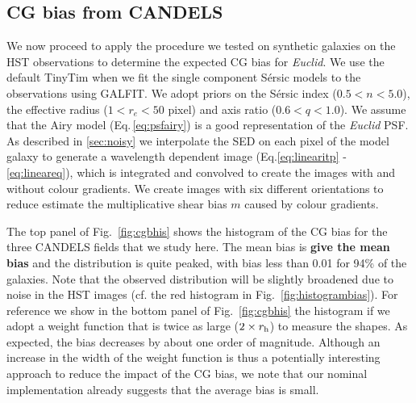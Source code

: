 \documentclass[useAMS,usenatbib]{mnras}
\begin{document}
\subsection{CG bias from CANDELS}

We now proceed to apply the procedure we tested on synthetic galaxies on the HST observations to determine the expected CG bias for {\it Euclid}. We use the default TinyTim when we fit the single component S{\'e}rsic models to the observations using {\sc GALFIT}. We adopt priors on the S{\'e}rsic index ($0.5<n<5.0$), the effective radius ($1<r_e<50$ pixel) and axis ratio ($0.6<q<1.0$). We assume that the 
Airy model (Eq.\,\ref{eq:psfairy}) is a good representation of the {\it Euclid} PSF. As described in
\ref{sec:noisy} we interpolate the SED on each pixel of the model galaxy to generate a wavelength dependent image (Eq.\ref{eq:linearitp} - \ref{eq:lineareq}), which is integrated and convolved to 
create the images with and without colour gradients. We create images with six different orientations
to reduce estimate the multiplicative shear bias $m$ caused by colour gradients.

The top panel of Fig.~\ref{fig:cgbhis} shows the histogram of the CG bias for the three CANDELS fields that we study here. The mean bias is {\bf give the mean bias} and the distribution is quite peaked, with bias less than 0.01 for 94\% of the galaxies. Note that the observed distribution will be slightly broadened due to noise in the HST images (cf. the red histogram in Fig.~\ref{fig:histogrambias}). For reference we show in the bottom panel of Fig.~\ref{fig:cgbhis} the histogram if we adopt a  weight function that is twice as large
($2\times r_{\rm h}$) to measure the shapes. As expected, the bias decreases by about one order of magnitude. Although an increase in the width of the weight function is thus a potentially interesting approach to reduce the impact of the CG bias, we note that our nominal implementation already suggests that the average  bias is small. 
\end{document}

